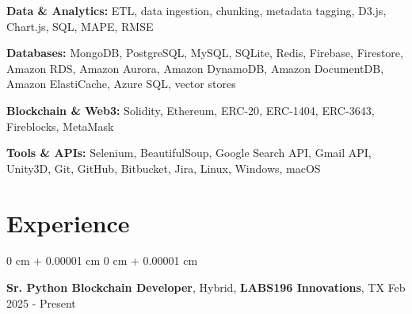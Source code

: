 \documentclass[10pt, letterpaper]{article}
\newenvironment{onecolentry}{
    \begin{adjustwidth}{
        0 cm + 0.00001 cm
    }{
        0 cm + 0.00001 cm
    }
}{
    \end{adjustwidth}
} %
\newcommand{\resumeheading}[2]{%
    \begin{onecolentry}
        #1 \hfill #2
    \end{onecolentry}
} %
\begin{document}
\vspace{0.25em}

\textbf{Data \& Analytics:}
ETL, data ingestion, chunking, metadata tagging, D3.js, Chart.js, SQL, MAPE, RMSE

\vspace{0.25em}

\textbf{Databases:}
MongoDB, PostgreSQL, MySQL, SQLite, Redis, Firebase, Firestore, Amazon RDS, Amazon Aurora, Amazon DynamoDB, Amazon DocumentDB, Amazon ElastiCache, Azure SQL, vector stores

\vspace{0.25em}

\textbf{Blockchain \& Web3:}
Solidity, Ethereum, ERC-20, ERC-1404, ERC-3643, Fireblocks, MetaMask

\vspace{0.25em}

\textbf{Tools \& APIs:}
Selenium, BeautifulSoup, Google Search API, Gmail API, Unity3D, Git, GitHub, Bitbucket, Jira, Linux, Windows, macOS



\section{Experience}

\resumeheading{\textbf{Sr. Python Blockchain Developer}, Hybrid, \textbf{LABS196 Innovations}, TX}{Feb 2025 - Present}
\end{document}

